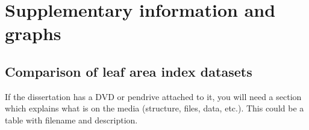 \chapter{Supplementary information and graphs}

\section{Comparison of leaf area index datasets}

If the dissertation has a DVD or pendrive attached to it, you will need a section which explains what is on the media (structure, files, data, etc.).  This could be a table with filename and description.

\blindtext[5]
